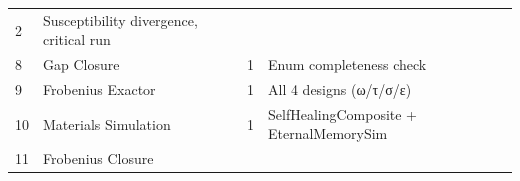 \begin{longtable}[]{@{}llll@{}}
\begin{minipage}[t]{0.20\columnwidth}
2\strut
\end{minipage} & \begin{minipage}[t]{0.29\columnwidth}\raggedright
Susceptibility divergence, critical run\strut
\end{minipage}\tabularnewline
\begin{minipage}[t]{0.09\columnwidth}\raggedright
8\strut
\end{minipage} & \begin{minipage}[t]{0.31\columnwidth}\raggedright
Gap Closure\strut
\end{minipage} & \begin{minipage}[t]{0.20\columnwidth}\raggedright
1\strut
\end{minipage} & \begin{minipage}[t]{0.29\columnwidth}\raggedright
Enum completeness check\strut
\end{minipage}\tabularnewline
\begin{minipage}[t]{0.09\columnwidth}\raggedright
9\strut
\end{minipage} & \begin{minipage}[t]{0.31\columnwidth}\raggedright
Frobenius Exactor\strut
\end{minipage} & \begin{minipage}[t]{0.20\columnwidth}\raggedright
1\strut
\end{minipage} & \begin{minipage}[t]{0.29\columnwidth}\raggedright
All 4 designs (ω/τ/σ/ε)\strut
\end{minipage}\tabularnewline
\begin{minipage}[t]{0.09\columnwidth}\raggedright
10\strut
\end{minipage} & \begin{minipage}[t]{0.31\columnwidth}\raggedright
Materials Simulation\strut
\end{minipage} & \begin{minipage}[t]{0.20\columnwidth}\raggedright
1\strut
\end{minipage} & \begin{minipage}[t]{0.29\columnwidth}\raggedright
SelfHealingComposite + EternalMemorySim\strut
\end{minipage}\tabularnewline
\begin{minipage}[t]{0.09\columnwidth}\raggedright
11\strut
\end{minipage} & \begin{minipage}[t]{0.31\columnwidth}\raggedright
Frobenius Closure\strut
\end{minipage} & \begin{minipage}[t]{0.20\columnwidth}\raggedright

\end{minipage}
\end{longtable}
